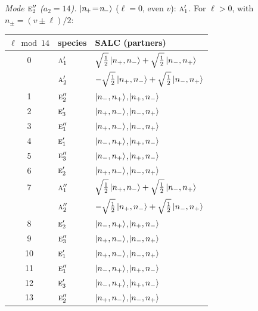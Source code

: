 \documentclass[11pt]{article}
\newcommand{\irr}[1]{\text{\normalfont\scshape #1}}
\begin{document}
\emph{Mode $\irr{e}_{2}''$ ($a_2=14$).} $\ket{n_{\!+}\!=\!n_{\!-}}$ ($\ell=0$, even $v$): $\irr{a}_{1}'$. For $\ell>0$, with $n_\pm=(v\pm\ell)/2$:
\begin{longtable}{c l l}\hline $\ell\bmod 14$ & species & SALC (partners)\\ \hline\endhead
0 & $\irr{a}_{1}'$ & $\sqrt{\tfrac{1}{2}}\ket{n_+,n_-}+\sqrt{\tfrac{1}{2}}\ket{n_-,n_+}$\\
 & $\irr{a}_{2}'$ & $-\sqrt{\tfrac{1}{2}}\ket{n_+,n_-}+\sqrt{\tfrac{1}{2}}\ket{n_-,n_+}$\\
1 & $\irr{e}_{2}''$ & $\ket{n_-,n_+}$,\quad $\ket{n_+,n_-}$\\
2 & $\irr{e}_{3}'$ & $\ket{n_+,n_-}$,\quad $\ket{n_-,n_+}$\\
3 & $\irr{e}_{1}''$ & $\ket{n_+,n_-}$,\quad $\ket{n_-,n_+}$\\
4 & $\irr{e}_{1}'$ & $\ket{n_-,n_+}$,\quad $\ket{n_+,n_-}$\\
5 & $\irr{e}_{3}''$ & $\ket{n_-,n_+}$,\quad $\ket{n_+,n_-}$\\
6 & $\irr{e}_{2}'$ & $\ket{n_+,n_-}$,\quad $\ket{n_-,n_+}$\\
7 & $\irr{a}_{1}''$ & $\sqrt{\tfrac{1}{2}}\ket{n_+,n_-}+\sqrt{\tfrac{1}{2}}\ket{n_-,n_+}$\\
 & $\irr{a}_{2}''$ & $-\sqrt{\tfrac{1}{2}}\ket{n_+,n_-}+\sqrt{\tfrac{1}{2}}\ket{n_-,n_+}$\\
8 & $\irr{e}_{2}'$ & $\ket{n_-,n_+}$,\quad $\ket{n_+,n_-}$\\
9 & $\irr{e}_{3}''$ & $\ket{n_+,n_-}$,\quad $\ket{n_-,n_+}$\\
10 & $\irr{e}_{1}'$ & $\ket{n_+,n_-}$,\quad $\ket{n_-,n_+}$\\
11 & $\irr{e}_{1}''$ & $\ket{n_-,n_+}$,\quad $\ket{n_+,n_-}$\\
12 & $\irr{e}_{3}'$ & $\ket{n_-,n_+}$,\quad $\ket{n_+,n_-}$\\
13 & $\irr{e}_{2}''$ & $\ket{n_+,n_-}$,\quad $\ket{n_-,n_+}$\\
\hline\end{longtable}
\end{document}
